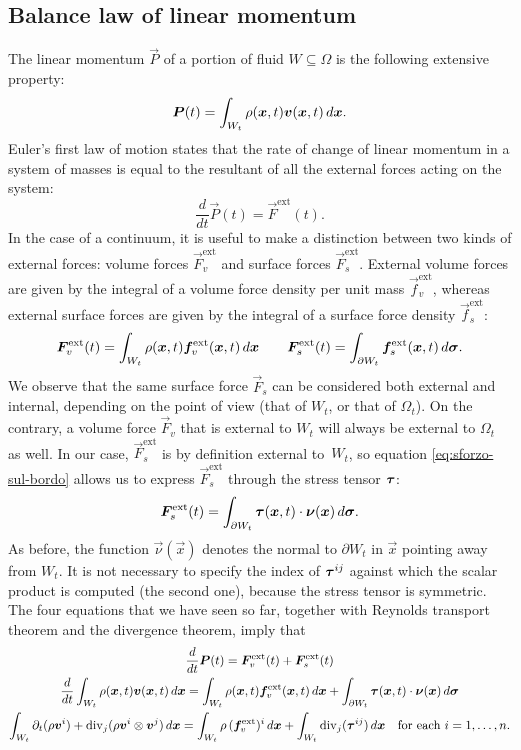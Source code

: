 \subsection*{Balance law of linear momentum}

The linear momentum $\vec{P}$ of a portion of fluid $W \subseteq \Omega$
is the following extensive property:
\[
\bm{P}(t) = \int_{W_t} \rho(\bm{x},t) \bm{v}(\bm{x},t) \, d\bm{x}.
\]
Euler's first law of motion states that the rate of change of
linear momentum in a system of masses is equal to the resultant
of all the external forces acting on the system:
\[
\frac{d}{dt} \vec{P}(t) = \vec{F}^{\text{ext}}(t).
\]
In the case of a continuum, it is useful to make a distinction
between two kinds of external forces: volume forces $\vec{F}_v^{\text{ext}}$
and surface forces $\vec{F}_s^{\text{ext}}$. External volume forces are
given by the integral of a volume force density per unit mass
$\vec{f}_v^{\text{ext}}$, whereas external surface forces are given
by the integral of a surface force density $\vec{f}_s^{\text{ext}}$:
\[
\bm{F}_v^{\text{ext}}(t)
= \int_{W_t} \rho(\bm{x},t) \bm{f}_v^{\text{ext}}(\bm{x},t) \, d\bm{x}
\qquad \bm{F}_s^{\text{ext}}(t)
= \int_{\partial W_t} \bm{f}_s^{\text{ext}}(\bm{x},t) \, d\bm{\sigma}.
\]
We observe that the same surface force $\vec{F}_s$ can be
considered both external and internal, depending on the point of
view (that of $W_t$, or that of $\Omega_t$).
On the contrary, a volume force $\vec{F}_v$ that is external to
$W_t$ will always be external to $\Omega_t$ as well.
In our case, $\vec{F}_s^{\text{ext}}$ is by definition external
to~$W_t$, so equation \eqref{eq:sforzo-sul-bordo} allows us
to express $\vec{F}_s^{\text{ext}}$ through the stress tensor $\bm{\tau}$:
\[
\bm{F}_s^{\text{ext}}(t)
= \int_{\partial W_t} \bm{\tau}(\bm{x},t) \cdot \bm{\nu}(\bm{x}) \, d\bm{\sigma}.
\]
As before, the function $\vec{\nu}(\vec{x})$ denotes the normal to
$\partial W_t$ in $\vec{x}$ pointing away from $W_t$.
It is not necessary to specify the index of $\bm{\tau}^{ij}$ against
which the scalar product is computed (the second one),
because the stress tensor is symmetric.
The four equations that we have seen so far, together with
Reynolds transport theorem and the divergence theorem, imply that
\begin{gather*}
\frac{d}{dt} \bm{P}(t) = \bm{F}_v^{\text{ext}}(t) + \bm{F}_s^{\text{ext}}(t) \\
\frac{d}{dt} \int_{W_t} \rho(\bm{x},t) \bm{v}(\bm{x},t) \, d\bm{x}
	= \int_{W_t} \rho(\bm{x},t) \bm{f}_v^{\text{ext}}(\bm{x},t) \, d\bm{x}
	+ \int_{\partial W_t} \bm{\tau}(\bm{x},t) \cdot \bm{\nu}(\bm{x}) \, d\bm{\sigma} \\
\int_{W_t} \partial_t (\rho \bm{v}^i)
	+ \operatorname{div}_j(\rho \bm{v}^i \otimes \bm{v}^j) \, d\bm{x}
	= \int_{W_t} \rho \, (\bm{f}_v^{\text{ext}})^i \, d\bm{x}
	+ \int_{W_t} \operatorname{div}_j(\bm{\tau}^{ij}) \, d\bm{x}
	\quad \text{for each $i = 1,\dots,n$}.
\end{gather*}
